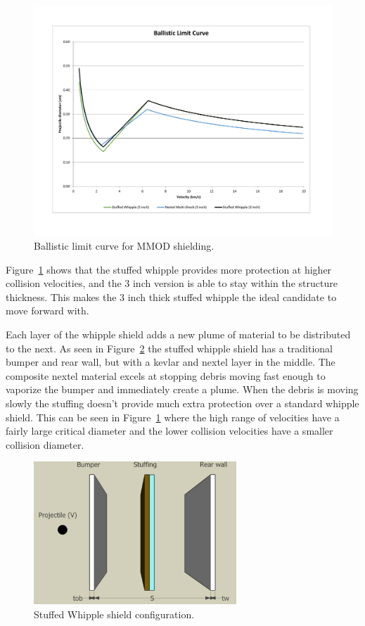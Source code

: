 \documentclass[paper=letter, fontsize=11pt]{scrartcl} %
\numberwithin{equation}{section} %
\numberwithin{figure}{section} %
\numberwithin{table}{section} %
\begin{document}
\begin{figure}[H]
	\begin{center}
	\includegraphics[width=5in]{BallisticLimit.pdf}
	\caption{Ballistic limit curve for MMOD shielding.}
	\label{fig:ballisticLimit}
	\end{center}
\end{figure}

Figure~\ref{fig:ballisticLimit} shows that the stuffed whipple provides more protection at higher collision velocities, and the 3 inch version is able to stay within the structure thickness. This makes the 3 inch thick stuffed whipple the ideal candidate to move forward with.

Each layer of the whipple shield adds a new plume of material to be distributed to the next. As seen in Figure~\ref{fig:stuffedWhipple} the stuffed whipple shield has a traditional bumper and rear wall, but with a kevlar and nextel layer in the middle. The composite nextel material excels at stopping debris moving fast enough to vaporize the bumper and immediately create a plume. When the debris is moving slowly the stuffing doesn't provide much extra protection over a standard whipple shield. This can be seen in Figure~\ref{fig:ballisticLimit} where the high range of velocities have a fairly large critical diameter and the lower collision velocities have a smaller collision diameter.

\begin{figure}[H]
	\begin{center}
	\includegraphics[width=3in]{stuffedWhipple.png}
	\caption{Stuffed Whipple shield configuration.}
	\label{fig:stuffedWhipple}
	\end{center}
\end{figure}
\end{document}
